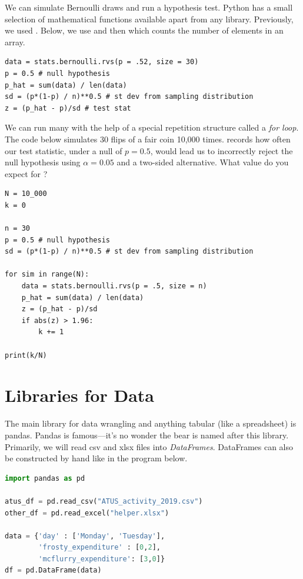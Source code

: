 \documentclass{article}
\begin{document}
We can simulate Bernoulli draws and run a hypothesis test. Python has a small selection of mathematical functions available apart from any library. Previously, we used . Below, we use  and then  which counts the number of elements in  an array.

\begin{lstlisting}
data = stats.bernoulli.rvs(p = .52, size = 30)
p = 0.5 # null hypothesis
p_hat = sum(data) / len(data)
sd = (p*(1-p) / n)**0.5 # st dev from sampling distribution
z = (p_hat - p)/sd # test stat
\end{lstlisting}

\noindent We can run many with the help of a special repetition structure called a \emph{for loop}. The code below simulates 30 flips of a fair coin 10,000 times.  records how often our test statistic, under a null of $p= 0.5$, would lead us to incorrectly reject the null hypothesis using $\alpha = 0.05$ and a two-sided alternative. What value do you expect for ? 

\begin{lstlisting}
N = 10_000
k = 0

n = 30
p = 0.5 # null hypothesis
sd = (p*(1-p) / n)**0.5 # st dev from sampling distribution

for sim in range(N):
    data = stats.bernoulli.rvs(p = .5, size = n)
    p_hat = sum(data) / len(data)
    z = (p_hat - p)/sd
    if abs(z) > 1.96:
        k += 1

print(k/N)
\end{lstlisting}



\section{Libraries for Data}

The main library for data wrangling and anything tabular (like a spreadsheet) is pandas. Pandas is famous---it's no wonder the bear is named after this library. Primarily, we will read csv and xlsx files into \emph{DataFrames}. DataFrames can also be constructed by hand like in the program below.

\begin{lstlisting}[language = Python]
import pandas as pd

atus_df = pd.read_csv("ATUS_activity_2019.csv")
other_df = pd.read_excel("helper.xlsx")

data = {'day' : ['Monday', 'Tuesday'], 
        'frosty_expenditure' : [0,2],
        'mcflurry_expenditure': [3,0]}
df = pd.DataFrame(data)
\end{lstlisting}
\end{document}

